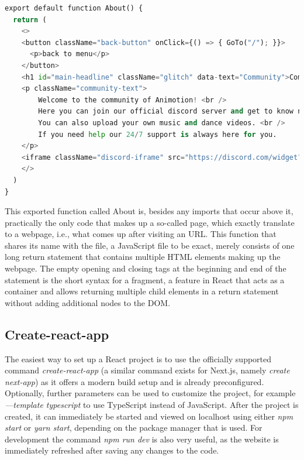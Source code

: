 \begin{lstlisting}[language=Python,caption=Example of a react component,label=lst:react]
  export default function About() {
  return (
    <>
    <button className="back-button" onClick={() => { GoTo("/"); }}>
      <p>back to menu</p>
    </button>
    <h1 id="main-headline" className="glitch" data-text="Community">Community</h1>
    <p className="community-text">
        Welcome to the community of Animotion! <br />
        Here you can join our official discord server and get to know new people. <br />
        You can also upload your own music and dance videos. <br />
        If you need help our 24/7 support is always here for you.
    </p>
    <iframe className="discord-iframe" src="https://discord.com/widget?id=1035647726634934382&theme=dark" allowtransparency="true" frameBorder="0" sandbox="allow-popups allow-popups-to-escape-sandbox allow-same-origin allow-scripts"></iframe>
    </>
  )
}
\end{lstlisting}

This exported function called About is, besides any imports that occur above it, practically the only code that makes 
up a so-called page, which exactly translate to a webpage, i.e., what comes up after visiting an URL. This function 
that shares its name with the file, a JavaScript file to be exact, merely consists of one long return statement that 
contains multiple HTML elements making up the webpage. \cite{ReactJSX}
The empty opening and closing tags at the beginning and end of the statement is the short syntax for a fragment, a 
feature in React that acts as a container and allows returning multiple child elements in a return statement 
without adding additional nodes to the DOM. \cite{ReactFragments}

\subsection{Create-react-app}
The easiest way to set up a React project is to use the officially supported command \emph{create-react-app}
(a similar command exists for Next.js, namely \emph{create next-app}) as it offers a modern build setup and is already preconfigured. 
Optionally, further parameters can be used to customize the project, for example \emph{—template typescript} to use TypeScript 
instead of JavaScript. After the project is created, it can immediately be started and viewed on localhost using either 
\emph{npm start} or \emph{yarn start}, depending on the package manager that is used. For development the command \emph{npm run dev} is 
also very useful, as the website is immediately refreshed after saving any changes to the code. \cite{create-react}

